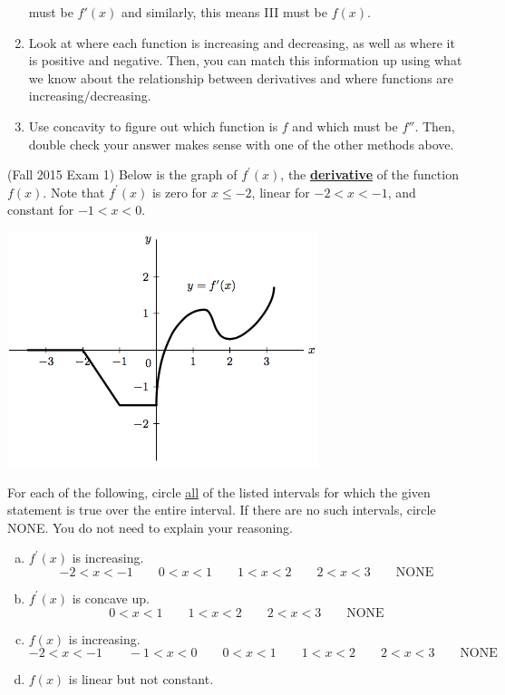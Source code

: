 \documentclass[11pt]{exam}
\begin{document}
\begin{questions}
\begin{solution}
\begin{enumerate}
      must be \(f'(x)\) and similarly, this means III must be
      \(f(x)\).
    \item Look at where each function is increasing and decreasing, as
      well as where it is positive and negative. Then, you can match
      this information up using what we know about the relationship
      between derivatives and where functions are
      increasing/decreasing.
    \item Use concavity to figure out which function is \(f\) and
      which must be \(f''\). Then, double check your answer makes
      sense with one of the other methods above.
    \end{enumerate}
  \end{solution}
\question (Fall 2015 Exam 1) Below is the graph of $f^\prime(x)$, the \underline{\textbf{derivative}} of the function $f(x)$. Note that $f^\prime(x)$ is zero for $x \leqslant -2$, linear for $-2 < x < -1$, and constant for $-1 <x < 0$.
  \begin{center}
    \includegraphics[scale=0.7]{graph_exam_problem.png}
  \end{center}
For each of the following, circle \underline{all} of the listed intervals for which the given statement is true over the entire interval. If there are no such intervals, circle NONE. You do not need to explain your reasoning.
\begin{enumerate}[(a)]
	\item $f^\prime(x)$ is increasing.
\[-2 < x < -1 \qquad 0 < x < 1 \qquad 1 < x < 2 \qquad 2 < x < 3 \qquad \text{NONE}\]
	\item $f^\prime(x)$ is concave up.
\[0<x<1 \qquad 1<x<2 \qquad 2<x<3 \qquad \text{NONE}\]
	\item $f(x)$ is increasing.
\[-2 < x < -1 \qquad -1 < x < 0 \qquad 0 < x < 1 \qquad 1 < x < 2 \qquad 2 < x < 3 \qquad \text{NONE}\]
	\item $f(x)$ is linear but not constant.

\end{enumerate}
\end{questions}
\end{document}
